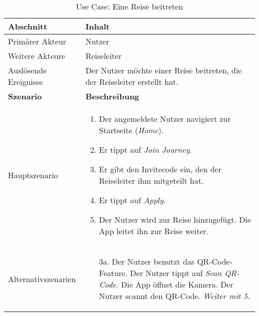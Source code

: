 \begin{table}[H]
	\footnotesize
	\caption{Use Case: Eine Reise beitreten}
	\begin{tabularx}{0.95\textwidth}{ |l|X| }
		\hline
		\rowcolor{gray} \textbf{Abschnitt}     & \textbf{Inhalt}                                                                  \\
		\hline
		Primärer Akteur                        & Nutzer                                                                           \\
		\hline
		Weitere Akteure                        & Reiseleiter                                                                      \\
		\hline
		Auslösende Ereignisse                  & Der Nutzer möchte einer Reise beitreten, die der Reiseleiter erstellt hat.       \\
		\hline
		\rowcolor{lightgray} \textbf{Szenario} & \textbf{Beschreibung}                                                            \\
		\hline
		Hauptszenario                          & \begin{enumerate}
			                                         \item Der angemeldete Nutzer navigiert zur Startseite (\emph{Home}).
			                                         \item Er tippt auf \emph{Join Journey}.
			                                         \item Er gibt den Invitecode ein, den der Reiseleiter ihm mitgeteilt hat.
			                                         \item Er tippt auf \emph{Apply}.
			                                         \item Der Nutzer wird zur Reise hinzugefügt. Die App leitet ihn zur Reise weiter.
		                                         \end{enumerate} \\
		\hline
		Alternativszenarien                    & \begin{enumerate}
			                                         \item[3a.] Der Nutzer benutzt das QR-Code-Feature.
				                                         \subitem[3a1.] Der Nutzer tippt auf \emph{Scan QR-Code}.
				                                         \subitem[3a2.] Die App öffnet die Kamera.
				                                         \subitem[3a3.] Der Nutzer scannt den QR-Code. \emph{Weiter mit 5.}
		                                         \end{enumerate}                \\

\end{tabularx}
\end{table}
